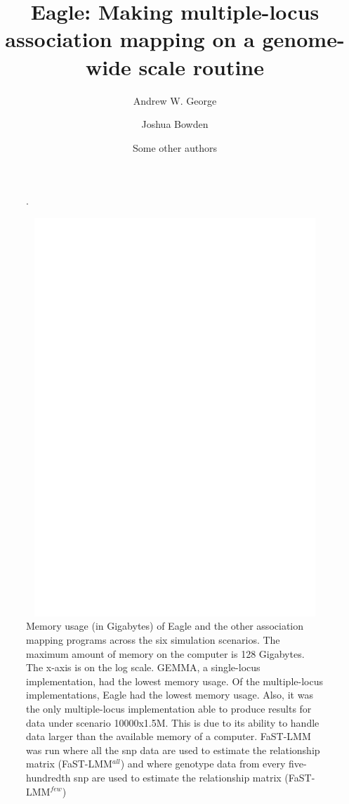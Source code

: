 \documentclass{article}
\begin{document}
\title{Eagle: Making multiple-locus association mapping on a genome-wide scale routine}
\author[1]{Andrew W. George}
\author[2]{Joshua Bowden}
\author[1]{Some other authors}


\maketitle


\begin{figure}
\caption{Memory usage (in Gigabytes) of Eagle and the other association mapping programs across 
the six simulation scenarios. The maximum amount of memory on the computer is 128 Gigabytes. 
The x-axis is on the log scale. GEMMA, a single-locus implementation, had the lowest memory usage. 
Of the multiple-locus implementations, Eagle had the lowest memory usage. Also, it 
was the only multiple-locus 
implementation able to produce results for data under  scenario 10000x1.5M. This is due to its ability 
to handle data larger than the available memory of a computer. FaST-LMM was run where all the snp data are used 
to estimate the relationship matrix (FaST-LMM$^{all}$)   and where genotype data from every five-hundredth snp are used to 
estimate the relationship matrix (FaST-LMM$^{few}$)}.
\begin{center}
\includegraphics[width=15cm, height=15cm]{mem.eps}
\end{center}
\end{figure}
\end{document}
